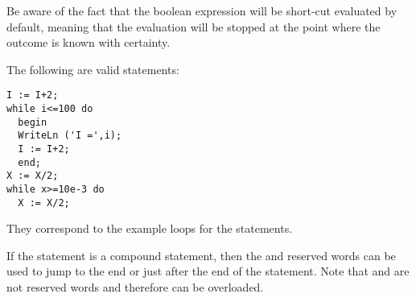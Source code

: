 Be aware of the fact that the boolean expression  will be
short-cut evaluated by default, meaning that the evaluation will be stopped
at the point where the outcome is known with certainty.

The following are valid  statements:
\begin{verbatim}
I := I+2;
while i<=100 do
  begin
  WriteLn ('I =',i);
  I := I+2;
  end;
X := X/2;
while x>=10e-3 do
  X := X/2;
\end{verbatim}
They correspond to the example loops for the  statements.

If the statement is a compound statement, then  the  and
 reserved words can be used to jump to the end or just
after the end of the  statement.
Note that  and  are not reserved words and
therefore can be overloaded.

